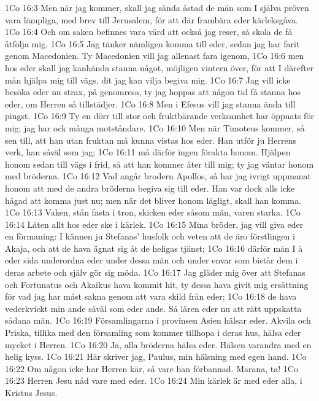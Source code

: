 1Co 16:3  Men när jag kommer, skall jag sända åstad de män som I själva pröven vara lämpliga, med brev till Jerusalem, för att där frambära eder kärleksgåva.
1Co 16:4  Och om saken befinnes vara värd att också jag reser, så skola de få åtfölja mig.
1Co 16:5  Jag tänker nämligen komma till eder, sedan jag har farit genom Macedonien. Ty Macedonien vill jag allenast fara igenom,
1Co 16:6  men hos eder skall jag kanhända stanna något, möjligen vintern över, för att I därefter mån hjälpa mig till vägs, dit jag kan vilja begiva mig.
1Co 16:7  Jag vill icke besöka eder nu strax, på genomresa, ty jag hoppas att någon tid få stanna hos eder, om Herren så tillstädjer.
1Co 16:8  Men i Efesus vill jag stanna ända till pingst.
1Co 16:9  Ty en dörr till stor och fruktbärande verksamhet har öppnats för mig; jag har ock många motståndare.
1Co 16:10  Men när Timoteus kommer, så sen till, att han utan fruktan må kunna vistas hos eder. Han utför ju Herrens verk, han såväl som jag;
1Co 16:11  må därför ingen förakta honom. Hjälpen honom sedan till vägs i frid, så att han kommer åter till mig; ty jag väntar honom med bröderna.
1Co 16:12  Vad angår brodern Apollos, så har jag ivrigt uppmanat honom att med de andra bröderna begiva sig till eder. Han var dock alls icke hågad att komma just nu; men när det bliver honom lägligt, skall han komma.
1Co 16:13  Vaken, stån fasta i tron, skicken eder såsom män, varen starka.
1Co 16:14  Låten allt hos eder ske i kärlek.
1Co 16:15  Mina bröder, jag vill giva eder en förmaning: I kännen ju Stefanas' husfolk och veten att de äro förstlingen i Akaja, och att de hava ägnat sig åt de heligas tjänst;
1Co 16:16  därför mån I å eder sida underordna eder under dessa män och under envar som bistår dem i deras arbete och själv gör sig möda.
1Co 16:17  Jag gläder mig över att Stefanas och Fortunatus och Akaikus hava kommit hit, ty dessa hava givit mig ersättning för vad jag har måst sakna genom att vara skild från eder;
1Co 16:18  de hava vederkvickt min ande såväl som eder ande. Så lären eder nu att rätt uppskatta sådana män.
1Co 16:19  Församlingarna i provinsen Asien hälsar eder. Akvila och Priska, tillika med den församling som kommer tillhopa i deras hus, hälsa eder mycket i Herren.
1Co 16:20  Ja, alla bröderna hälsa eder. Hälsen varandra med en helig kyss.
1Co 16:21  Här skriver jag, Paulus, min hälsning med egen hand.
1Co 16:22  Om någon icke har Herren kär, så vare han förbannad. Marana, ta!
1Co 16:23  Herren Jesu nåd vare med eder.
1Co 16:24  Min kärlek är med eder alla, i Kristus Jesus.



